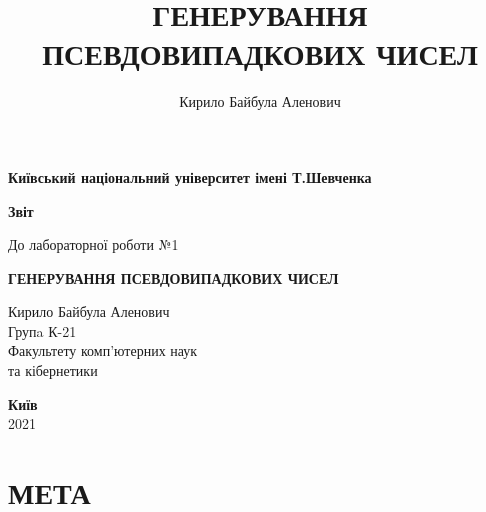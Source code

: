 \documentclass[a4paper,12pt]{report}
\author{Кирило Байбула Аленович}
\title{ГЕНЕРУВАННЯ ПСЕВДОВИПАДКОВИХ ЧИСЕЛ}
\begin{document}
  \begin{titlepage}
    \begin{center}
        \Large
        \textbf{Київський національний університет імені Т.Шевченка}
        \vspace{5cm}

        \Huge
        \textbf{Звіт}

        \LARGE
        До лабораторної роботи №1
        \vspace{0.5cm}

        \textbf{ГЕНЕРУВАННЯ ПСЕВДОВИПАДКОВИХ ЧИСЕЛ}
        \vfill
    \end{center}

    \begin{FlushRight}
        Кирило Байбула Аленович\\
        Групa К-21\\
        Факультету комп’ютерних наук \\
        та кібернетики
    \end{FlushRight}

      \vspace{0.5cm}

    \begin{center}
      \textbf{Київ} \\
      2021
    \end{center}

  \end{titlepage}
  \clearpage

  \chapter*{МЕТА}
\end{document}

